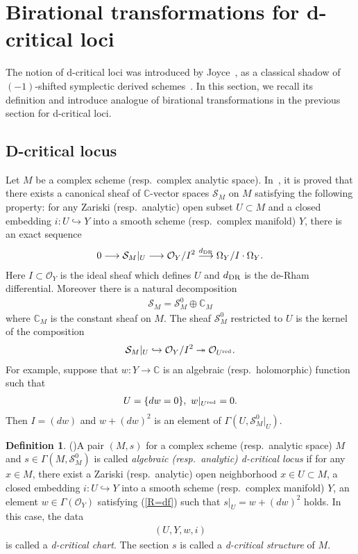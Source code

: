\documentclass[11pt]{amsart}
\theoremstyle{plain}
\theoremstyle{definition}
\newtheorem{defi}[thm]{Definition}
\theoremstyle{remark}
\newcommand{\oO}{\mathcal{O}}
\newcommand{\sS}{\mathcal{S}}
\begin{document}
\section{Birational transformations for d-critical loci}\label{sec:dbir}
The notion of d-critical loci was introduced by Joyce~\cite{JoyceD}, 
as a classical shadow of $(-1)$-shifted symplectic derived schemes~\cite{PTVV}. 
In this section, we recall its definition and introduce 
analogue of birational transformations in the previous section 
for d-critical loci. 

\subsection{D-critical locus}
Let $M$ be a complex scheme (resp.~complex analytic space). 
In~\cite{JoyceD}, it 
is proved 
that 
there exists a canonical sheaf of 
$\mathbb{C}$-vector spaces 
$\sS_{M}$ on $M$
satisfying the following
property:
for any Zariski (resp.~analytic) 
open subset $U \subset M$
and a closed embedding 
$i \colon U \hookrightarrow Y$
into a smooth scheme (resp.~complex manifold) $Y$, 
there is an exact sequence
\begin{align}\label{S:property}
0 \longrightarrow \sS_{M}|_{U}
 \longrightarrow \oO_Y/I^2 \stackrel{d_{\rm{DR}}}{\longrightarrow}
\Omega_Y/I \cdot \Omega_Y. 
\end{align}
Here $I \subset \oO_Y$ is the ideal sheaf
which defines $U$
and $d_{\rm{DR}}$ is the de-Rham differential. 
Moreover there is a natural decomposition 
\begin{align*}
\sS_M=\sS_M^0 \oplus \mathbb{C}_M
\end{align*}
where $\mathbb{C}_M$ is the constant sheaf
on $M$. 
The sheaf $\sS_M^{0}$ restricted to $U$ is 
the kernel of the 
composition 
\begin{align*}
\sS_M|_{U} \hookrightarrow \oO_Y/I^2 \twoheadrightarrow \oO_{U^{\rm{red}}}. 
\end{align*}
For example, 
suppose that  
$w \colon Y \to \mathbb{C}$ is
an algebraic (resp.~holomorphic) function such that 
\begin{align}\label{R=df}
U=\{dw=0\}, \ 
w|_{U^{\rm{red}}}=0.
\end{align}
Then $I=(dw)$ and 
$w+(dw)^2$ is an element of
$\Gamma(U, \sS_{M}^0|_{U})$. 

\begin{defi}(\cite{JoyceD})\label{defi:dcrit}
A pair $(M, s)$
for a complex scheme (resp.~analytic space) $M$
and $s \in \Gamma(M, \sS_M^0)$
is called \textit{algebraic (resp.~analytic) d-critical 
locus} 
if for any 
$x \in M$, there exist a Zariski (resp.~analytic) open 
neighborhood $x \in U \subset M$,  
a closed embedding $i \colon U \hookrightarrow Y$
into a smooth scheme (resp.~complex manifold) $Y$, 
an element $w \in \Gamma(\oO_Y)$ 
satisfying (\ref{R=df})
such that 
$s|_{U}=w+(dw)^2$
holds. 
In this case, 
the data
\begin{align}\label{crit:chart}
(U, Y, w, i)
\end{align}
is called a \textit{d-critical chart}.
The section $s$ is called a \textit{d-critical 
structure} of $M$.  
\end{defi} 
\end{document}
